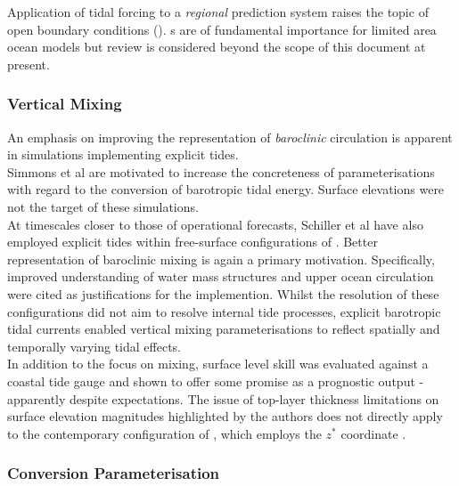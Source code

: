 Application of tidal forcing to a \emph{regional} prediction system raises the topic of open boundary conditions (\obc{}).  \obc{}s are of fundamental importance for limited area ocean models but review is considered beyond the scope of this document at present.\\


\subsubsection{Vertical Mixing}

An emphasis on improving the representation of \emph{baroclinic} circulation is apparent in \OGCM{} simulations implementing explicit tides.\\
Simmons et al \citep{Simmons:2004fi} are motivated to increase the concreteness of parameterisations with regard to the conversion of barotropic tidal energy.  Surface elevations were not the target of these simulations. \\


At timescales closer to those of operational forecasts, Schiller et al have also employed explicit tides within free-surface configurations of \MOM{}.  
Better representation of baroclinic mixing is again a primary motivation. 
Specifically, improved understanding of water mass structures \cite{Schiller:2004fv} and upper ocean circulation \cite{Schiller:2007gk} were cited as justifications for the implemention.  
Whilst the resolution of these configurations did not aim to resolve internal tide processes, explicit barotropic tidal currents enabled vertical mixing parameterisations to reflect spatially and temporally varying tidal effects.\\
In addition to the focus on mixing, surface level skill was evaluated against a coastal tide gauge and shown to offer some promise as a prognostic output \citep[Fig 2]{Schiller:2007gk} - apparently despite expectations.   
The issue of top-layer thickness limitations on surface elevation magnitudes highlighted by the authors does not directly apply to the contemporary \BL{} configuration of \MOM{}, which employs the $z^*$ coordinate \citep{Brassington:2012wm}.\\


\subsubsection{Conversion Parameterisation}

